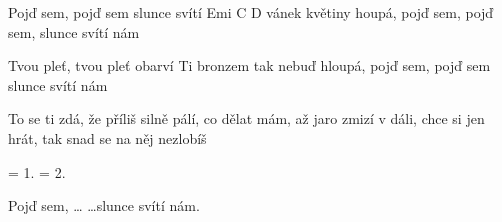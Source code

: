 
\beginverse{}
Pojď sem, pojď sem slunce svítí Emi C D
vánek květiny houpá,
pojď sem, pojď sem, slunce svítí nám
\endverse{}

\beginverse{}
Tvou pleť, tvou pleť obarví Ti bronzem tak nebuď hloupá, pojď sem, pojď sem
slunce svítí nám
\endverse{}

\beginchorus{}
To se ti zdá, že příliš silně pálí,
co dělat mám, až jaro zmizí v dáli,
chce si jen hrát, tak snad se na něj nezlobíš
\endchorus{}

\beginchorus{}
= 1.
= 2.

\endchorus{}

\beginverse{}
Pojď sem, \ldots{}
\ldots{}slunce svítí nám.
\endverse{}

\endsong{}
